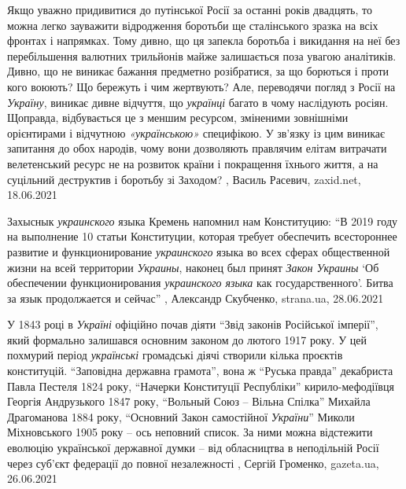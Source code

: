 Якщо уважно придивитися до путінської Росії за останні років двадцять, то можна
легко зауважити відродження боротьби ще сталінського зразка на всіх фронтах і
напрямках. Тому дивно, що ця запекла боротьба і викидання на неї без
перебільшення валютних трильйонів майже залишається поза увагою аналітиків.
Дивно, що не виникає бажання предметно розібратися, за що борються і проти кого
воюють? Що бережуть і чим жертвують?  Але, переводячи погляд з Росії на
\emph{Україну}, виникає дивне відчуття, що \emph{українці} багато в чому наслідують росіян.
Щоправда, відбувається це з меншим ресурсом, зміненими зовнішніми орієнтирами і
відчутною \emph{«українською»} специфікою. У зв’язку із цим виникає запитання до обох
народів, чому вони дозволяють правлячим елітам витрачати велетенський ресурс не
на розвиток країни і покращення їхнього життя, а на суцільний деструктив і
боротьбу зі Заходом?
, 
Василь Расевич, zaxid.net, 18.06.2021

Захыснык \emph{украинского} языка Кремень напомнил нам Конституцию: \enquote{В 2019 году на
выполнение 10 статьи Конституции, которая требует обеспечить всестороннее
развитие и функционирование \emph{украинского} языка во всех сферах общественной жизни
на всей территории \emph{Украины}, наконец был принят \emph{Закон Украины} \enquote{Об обеспечении
функционирования \emph{украинского языка} как государственного}. Битва за язык
продолжается и сейчас}
, 
Александр Скубченко, strana.ua, 28.06.2021


У 1843 році в \emph{Україні} офіційно почав діяти \enquote{Звід законів Російської імперії},
який формально залишався основним законом до лютого 1917 року. У цей похмурий
період \emph{українські} громадські діячі створили кілька проєктів конституцій.
\enquote{Заповідна державна грамота}, вона ж \enquote{Руська правда} декабриста Павла Пестеля
1824 року, \enquote{Начерки Конституції Республіки} кирило-мефодіївця Георгія
Андрузького 1847 року, \enquote{Вольный Союз – Вільна Спілка} Михайла Драгоманова 1884
року, \enquote{Основний Закон самостійної \emph{України}} Миколи Міхновського 1905 року – ось
неповний список. За ними можна відстежити еволюцію української державної думки
– від обласництва в неподільній Росії через суб'єкт федерації до повної
незалежності
, 
Сергій Громенко, gazeta.ua, 26.06.2021


